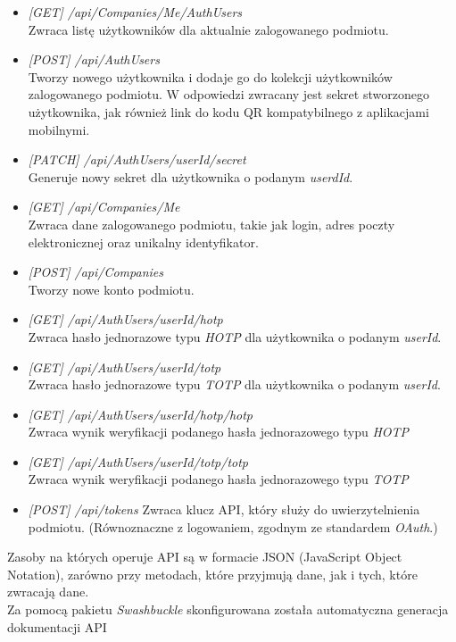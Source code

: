 \begin{itemize}
	\item \textit{[GET] /api/Companies/Me/AuthUsers} \\
		Zwraca listę użytkowników dla aktualnie zalogowanego podmiotu.
	\item \textit{[POST] /api/AuthUsers} \\
		Tworzy nowego użytkownika i dodaje go do kolekcji użytkowników zalogowanego podmiotu.
		W odpowiedzi zwracany jest sekret stworzonego użytkownika, jak również link 
		do kodu QR kompatybilnego z aplikacjami mobilnymi.
	\item \textit{[PATCH] /api/AuthUsers/{userId}/secret} \\
		Generuje nowy sekret dla użytkownika o podanym \textit{userdId}.
	\item \textit{[GET] /api/Companies/Me} \\ 
		Zwraca dane zalogowanego podmiotu, takie jak login, adres poczty elektronicznej oraz unikalny identyfikator.
	\item \textit{[POST] /api/Companies} \\
		Tworzy nowe konto podmiotu. 
	\item \textit{[GET] /api/AuthUsers/{userId}/hotp} \\
		Zwraca hasło jednorazowe typu \textit{HOTP} dla użytkownika o podanym \textit{userId}.
	\item \textit{[GET] /api/AuthUsers/{userId}/totp} \\
		Zwraca hasło jednorazowe typu \textit{TOTP} dla użytkownika o podanym \textit{userId}.
	\item \textit{[GET] /api/AuthUsers/{userId}/hotp/{hotp}} \\
		Zwraca wynik weryfikacji podanego hasła jednorazowego typu \textit{HOTP}
	\item \textit{[GET] /api/AuthUsers/{userId}/totp/{totp}} \\
		Zwraca wynik weryfikacji podanego hasła jednorazowego typu \textit{TOTP}
	\item \textit{[POST] /api/tokens}
		Zwraca klucz API, który służy do uwierzytelnienia podmiotu. (Równoznaczne z logowaniem,
		zgodnym ze standardem \textit{OAuth}.)
\end{itemize}
Zasoby na których operuje API są w formacie JSON (JavaScript Object Notation), zarówno przy metodach, które
przyjmują dane, jak i tych, które zwracają dane. \\
Za pomocą pakietu \textit{Swashbuckle} skonfigurowana została automatyczna generacja dokumentacji API
